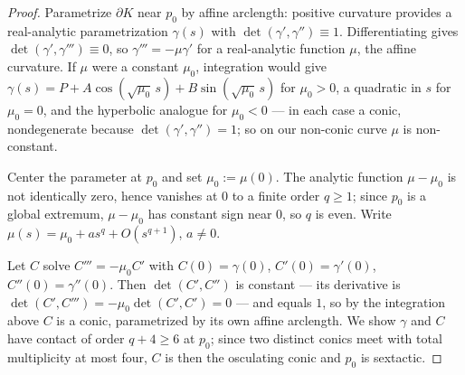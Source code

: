 \documentclass[11pt]{amsart}
\theoremstyle{definition}
\begin{document}
\begin{proof}
Parametrize $\partial K$ near $p_0$ by affine arclength: positive curvature
provides a real-analytic parametrization $\gamma(s)$ with
$\det(\gamma',\gamma'')\equiv1$. Differentiating gives
$\det(\gamma',\gamma''')\equiv0$, so $\gamma'''=-\mu\gamma'$ for a
real-analytic function $\mu$, the affine curvature. If $\mu$ were a constant
$\mu_0$, integration would give
$\gamma(s)=P+A\cos(\sqrt{\mu_0}\,s)+B\sin(\sqrt{\mu_0}\,s)$ for $\mu_0>0$,
a quadratic in $s$ for $\mu_0=0$, and the hyperbolic analogue for $\mu_0<0$
--- in each case a conic, nondegenerate because $\det(\gamma',\gamma'')=1$;
so on our non-conic curve $\mu$ is non-constant.

Center the parameter at $p_0$ and set $\mu_0:=\mu(0)$. The analytic function
$\mu-\mu_0$ is not identically zero, hence vanishes at $0$ to a finite order
$q\ge1$; since $p_0$ is a global extremum, $\mu-\mu_0$ has constant sign near
$0$, so $q$ is even. Write $\mu(s)=\mu_0+as^q+O(s^{q+1})$, $a\ne0$.

Let $C$ solve $C'''=-\mu_0C'$ with $C(0)=\gamma(0)$, $C'(0)=\gamma'(0)$,
$C''(0)=\gamma''(0)$. Then $\det(C',C'')$ is constant --- its derivative is
$\det(C',C''')=-\mu_0\det(C',C')=0$ --- and equals $1$, so by the
integration above $C$ is a conic, parametrized by its own affine arclength.
We show $\gamma$ and $C$ have contact of order $q+4\ge6$ at $p_0$; since two
distinct conics meet with total multiplicity at most four, $C$ is then the
osculating conic and $p_0$ is sextactic.


\end{proof}
\end{document}
